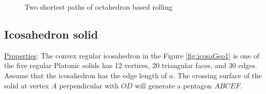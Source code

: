 \begin{center}
\begin{figure}[h]
\hfill
{}
\caption{Two shortest paths of octahedron based rolling}
\label{fig:octaPaths}
\end{figure}
\end{center}
\clearpage
\newpage
\subsection{Icosahedron solid}
\noindent\uline{Properties}:
The convex regular icosahedron in the Figure \ref{fig:icosaGeo1} is one of the five regular Platonic solids has 12 vertices, 20 triangular faces, and 30 edges. Assume that the icosahedron has the edge length of $a$. The crossing surface of the solid at vertex $A$ perpendicular with $OD$ will generate a pentagon $ABCEF$.

